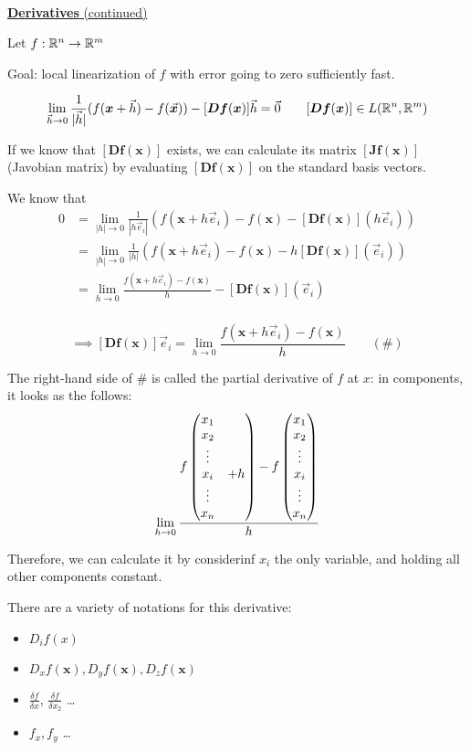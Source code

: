 \\

\ul{\textbf{Derivatives} (continued)}

Let $f : \mathbb{R}^n \rightarrow \mathbb{R}^m$

Goal: local linearization of $f$ with error going to zero sufficiently fast.

\[\lim_{\vec{h}\rightarrow 0}\frac{1}{|\vec{h}|}(f(\bm{x}+\vec{h})-f(\vec{\bm{x}}))-[\bm{Df}(\bm{x})]\vec{h}=\vec{0}\qquad [\bm{Df}(\bm{x})]\in L(\mathbb{R}^n, \mathbb{R}^m)\]

If we know that $[\bm{Df}(\bm{x})]$ exists, we can calculate its matrix $[\bm{Jf}(\bm{x})]$ (Javobian matrix) by evaluating $[\bm{Df}(\bm{x})]$ on the standard basis vectors.

We know that
\begin{align*}
0 &= \lim_{|h|\rightarrow 0}\frac{1}{|h\vec{e}_i|}\left( f(\bm{x}+h\vec{e}_i)-f(\bm{x})-[\bm{Df}(\bm{x})](h\vec{e}_i) \right) \\
&= \lim_{|h|\rightarrow 0}\frac{1}{|h|}\left( f(\bm{x}+h\vec{e}_i)-f(\bm{x})-h[\bm{Df}(\bm{x})](\vec{e}_i)\right) \\
&= \lim_{h\rightarrow 0}\frac{f(\bm{x}+h\vec{e}_i)-f(\bm{x})}{h} -[\bm{Df}(\bm{x})](\vec{e}_i) \\
\end{align*}

\vspace{-12pt}

\[\implies [\bm{Df}(\bm{x})]\vec{e}_i = \lim_{h\rightarrow 0}\frac{f(\bm{x}+h\vec{e}_i)-f(\bm{x})}{h}\qquad (\#)\]

The right-hand side of $\#$ is called the partial derivative of $f$ at $x$: in components, it looks as the follows:
\[\lim_{h\rightarrow 0}\frac{
f\begin{pmatrix} x_1& \\ x_2& \\ \vdots& \\ x_i &+ h \\ \vdots & \\ x_n& \end{pmatrix} - f\begin{pmatrix} x_1 \\ x_2 \\ \vdots \\ x_i \\ \vdots \\ x_n \end{pmatrix}
}{h}\]

Therefore, we can calculate it by considerinf $x_i$ the only variable, and holding all other components constant.

There are a variety of notations for this derivative:
\begin{itemize}
  \item $D_i f(x)$
  \item $D_x f(\bm{x}), D_y f(\bm{x}), D_z f(\bm{x})$
  \item $\frac{\delta f}{\delta x}$, $\frac{\delta f}{\delta x_2}$ \dots
  \item $f_x, f_y$ \dots
\end{itemize}

